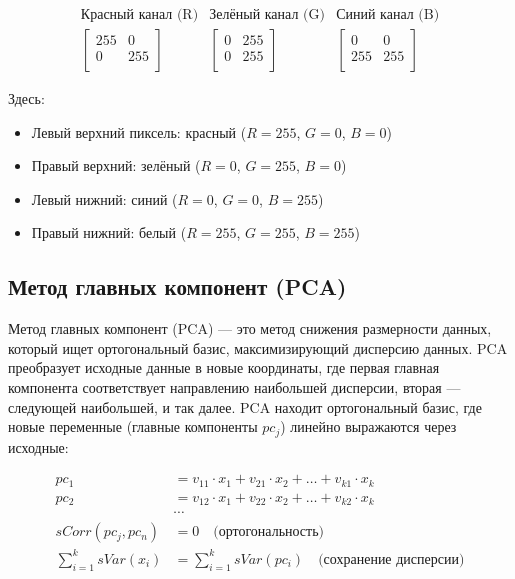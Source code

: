 \documentclass[14pt]{extarticle}
\begin{document}
\begin{equation*}
\begin{array}{ccc}
\text{Красный канал (R)} & \text{Зелёный канал (G)} & \text{Синий канал (B)} \\
\begin{bmatrix}
255 & 0 \\
0 & 255 \\
\end{bmatrix} &
\begin{bmatrix}
0 & 255 \\
0 & 255 \\
\end{bmatrix} &
\begin{bmatrix}
0 & 0 \\
255 & 255 \\
\end{bmatrix}
\end{array}
\end{equation*}

Здесь:
\begin{itemize}
\item Левый верхний пиксель: красный ($R=255$, $G=0$, $B=0$)
\item Правый верхний: зелёный ($R=0$, $G=255$, $B=0$)
\item Левый нижний: синий ($R=0$, $G=0$, $B=255$)
\item Правый нижний: белый ($R=255$, $G=255$, $B=255$)
\end{itemize}

\subsection{Метод главных компонент (PCA)}
Метод главных компонент (PCA) — это метод снижения размерности данных, который ищет ортогональный базис, максимизирующий дисперсию данных. PCA преобразует исходные данные в новые координаты, где первая главная компонента соответствует направлению наибольшей дисперсии, вторая — следующей наибольшей, и так далее. PCA находит ортогональный базис, где новые переменные (главные компоненты $pc_j$) линейно выражаются через исходные:

\begin{align*}
pc_1 &= v_{11} \cdot x_1 + v_{21} \cdot x_2 + \ldots + v_{k1} \cdot x_k \\
pc_2 &= v_{12} \cdot x_1 + v_{22} \cdot x_2 + \ldots + v_{k2} \cdot x_k \\
&\cdots \\
sCorr(pc_j, pc_n) &= 0 \quad \text{(ортогональность)} \\
\sum_{i=1}^k sVar(x_i) &= \sum_{i=1}^k sVar(pc_i) \quad \text{(сохранение дисперсии)}
\end{align*}
\end{document}
